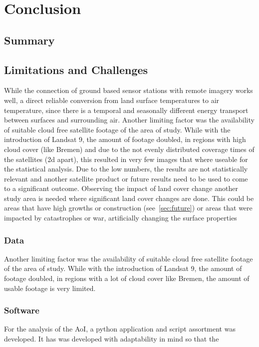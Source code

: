 \documentclass[12pt,a4paper, english,twoside]{scrartcl}
\begin{document}
\newpage
\section{Conclusion}\label{sec:conclusion}
    
\subsection{Summary}


\subsection{Limitations and Challenges}
  While the connection of ground based sensor stations with remote imagery works well, a direct reliable conversion from land surface temperatures to air temperature, since there is a temporal and seasonally different energy transport between surfaces and surrounding air. 
  Another limiting factor was the availability of suitable cloud free satellite footage of the area of study.
  While with the introduction of Landsat 9, the amount of footage doubled, in regions with high cloud cover (like Bremen) and due to the not evenly distributed coverage times of the satellites (2d apart), this resulted in very few images that where useable for the statistical analysis. 
  Due to the low numbers, the results are not statistically relevant and another satellite product or future results need to be used to come to a significant outcome. 
  Observing the impact of land cover change another study area is needed where significant land cover changes are done. 
  This could be areas that have high growths or construction (see~\cref{sec:future}) or areas that were impacted by catastrophes or war, artificially changing the surface properties 

\subsubsection{Data}
Another limiting factor was the availability of suitable cloud free satellite footage of the area of study.
While with the introduction of Landsat 9, the amount of footage doubled, in regions with a lot of cloud cover like Bremen, the amount of usable footage is very limited.

\subsubsection{Software}
For the analysis of the \gls{AoI}, a python application and script assortment was developed. 
It has was developed with adaptability in mind so that the 

\newpage
\end{document}
